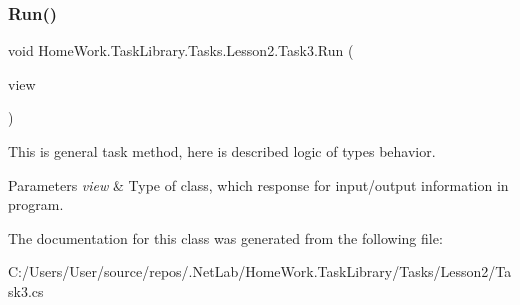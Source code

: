 \subsubsection{\texorpdfstring{Run()}{Run()}}
{\footnotesize\ttfamily void Home\+Work.\+Task\+Library.\+Tasks.\+Lesson2.\+Task3.\+Run (\begin{DoxyParamCaption}\item[{I\+Information}]{view }\end{DoxyParamCaption})}



This is general task method, here is described logic of types behavior. 


\begin{DoxyParams}{Parameters}
{\em view} & Type of class, which response for input/output information in program.\\
\hline
\end{DoxyParams}


The documentation for this class was generated from the following file\+:\begin{DoxyCompactItemize}
\item 
C\+:/\+Users/\+User/source/repos/.\+Net\+Lab/\+Home\+Work.\+Task\+Library/\+Tasks/\+Lesson2/Task3.\+cs\end{DoxyCompactItemize}
